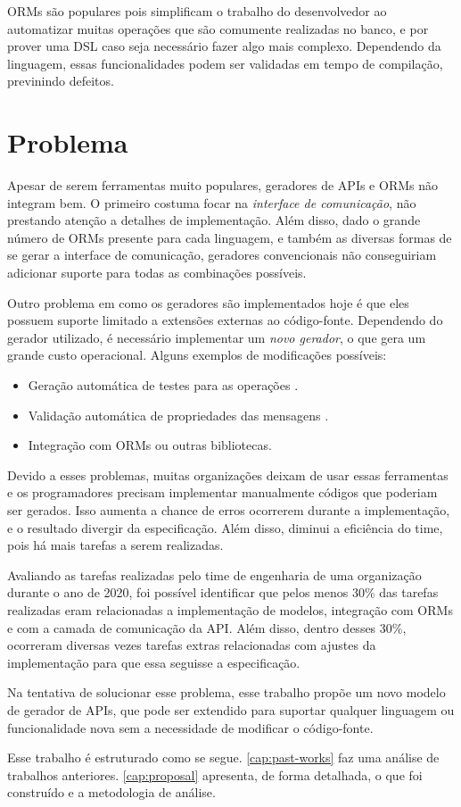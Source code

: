ORMs são populares pois simplificam o trabalho do desenvolvedor ao automatizar muitas
operações que são comumente realizadas no banco, e por prover uma DSL caso seja
necessário fazer algo mais complexo. Dependendo da linguagem, essas funcionalidades
podem ser validadas em tempo de compilação, previnindo defeitos.

\section{Problema}

Apesar de serem ferramentas muito populares, geradores de APIs e ORMs não integram
bem. O primeiro costuma focar na \textit{interface de comunicação}, não prestando
atenção a detalhes de implementação. Além disso, dado o grande número de ORMs
presente para cada linguagem, e também as diversas formas de se gerar a interface
de comunicação, geradores convencionais não conseguiriam adicionar suporte para
todas as combinações possíveis.

Outro problema em como os geradores são implementados hoje é que eles possuem
suporte limitado a extensões externas ao código-fonte. Dependendo do gerador
utilizado, é necessário implementar um \textit{novo gerador}, o que gera um grande
custo operacional. Alguns exemplos de modificações possíveis:

\begin{itemize}
\item
  Geração automática de testes para as operações \cite{9159071}.
\item
  Validação automática de propriedades das mensagens \cite{envoy:protoc-gen-validate}.
\item
  Integração com ORMs ou outras bibliotecas.
\end{itemize}

Devido a esses problemas, muitas organizações deixam de usar essas ferramentas e os
programadores precisam implementar manualmente códigos que poderiam ser gerados.
Isso aumenta a chance de erros ocorrerem durante a implementação, e o resultado divergir
da especificação. Além disso, diminui a eficiência do time, pois há mais tarefas a
serem realizadas.

Avaliando as tarefas realizadas pelo time de engenharia de uma organização durante o
ano de 2020, foi possível identificar que pelos menos 30\% das tarefas realizadas
eram relacionadas a implementação de modelos, integração com ORMs e com a camada
de comunicação da API. Além disso, dentro desses 30\%, ocorreram diversas vezes tarefas
extras relacionadas com ajustes da implementação para que essa seguisse a especificação.

Na tentativa de solucionar esse problema, esse trabalho propõe um novo modelo de
gerador de APIs, que pode ser extendido para suportar qualquer linguagem ou funcionalidade
nova sem a necessidade de modificar o código-fonte.

Esse trabalho é estruturado como se segue. \cref{cap:past-works} faz uma análise
de trabalhos anteriores. \cref{cap:proposal} apresenta, de forma detalhada, o que
foi construído e a metodologia de análise.
